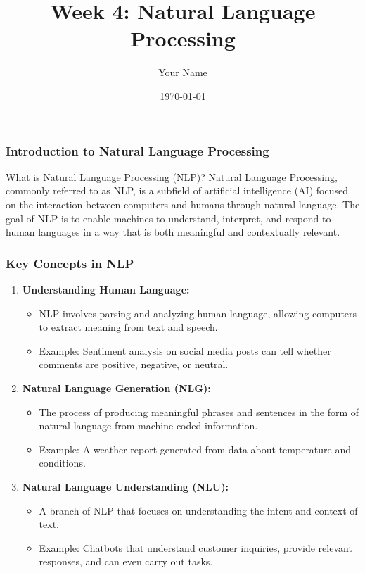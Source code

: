 \documentclass{beamer}
\title{Week 4: Natural Language Processing}
\author{Your Name}
\institute{Your Institution}
\date{\today}
\begin{document}
\frame{\titlepage}

\begin{frame}[fragile]
    \frametitle{Introduction to Natural Language Processing}
    \begin{block}{What is Natural Language Processing (NLP)?}
        Natural Language Processing, commonly referred to as NLP, is a subfield of artificial intelligence (AI) focused on the interaction between computers and humans through natural language. The goal of NLP is to enable machines to understand, interpret, and respond to human languages in a way that is both meaningful and contextually relevant.
    \end{block}
\end{frame}

\begin{frame}[fragile]
    \frametitle{Key Concepts in NLP}
    \begin{enumerate}
        \item \textbf{Understanding Human Language:}
        \begin{itemize}
            \item NLP involves parsing and analyzing human language, allowing computers to extract meaning from text and speech.
            \item Example: Sentiment analysis on social media posts can tell whether comments are positive, negative, or neutral.
        \end{itemize}
        
        \item \textbf{Natural Language Generation (NLG):}
        \begin{itemize}
            \item The process of producing meaningful phrases and sentences in the form of natural language from machine-coded information.
            \item Example: A weather report generated from data about temperature and conditions.
        \end{itemize}
        
        \item \textbf{Natural Language Understanding (NLU):}
        \begin{itemize}
            \item A branch of NLP that focuses on understanding the intent and context of text.
            \item Example: Chatbots that understand customer inquiries, provide relevant responses, and can even carry out tasks.
        \end{itemize}
    \end{enumerate}
\end{frame}
\end{document}
